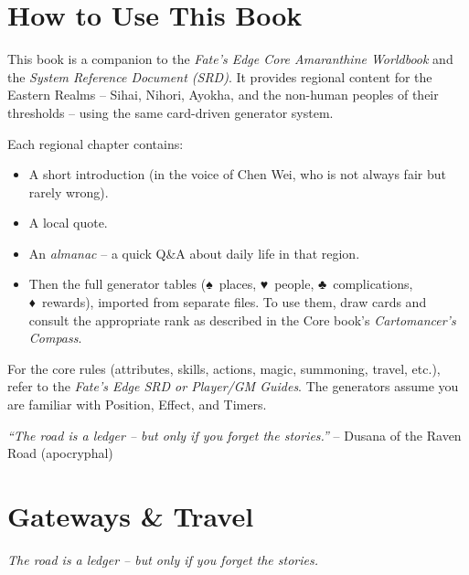 \documentclass[12pt,oneside]{book}
\newcommand{\spadesuit}{♠}
\newcommand{\heartsuit}{♥}
\newcommand{\clubsuit}{♣}
\newcommand{\diamondsuit}{♦}
\begin{document}
\chapter*{How to Use This Book}

This book is a companion to the \textit{Fate's Edge Core Amaranthine Worldbook} and the \textit{System Reference Document (SRD)}. It provides regional content for the Eastern Realms -- Sihai, Nihori, Ayokha, and the non-human peoples of their thresholds -- using the same card-driven generator system.

Each regional chapter contains:
\begin{itemize}
  \item A short introduction (in the voice of Chen Wei, who is not always fair but rarely wrong).
  \item A local quote.
  \item An \emph{almanac} -- a quick Q\&A about daily life in that region.
  \item Then the full generator tables (\spadesuit\ places, \heartsuit\ people, \clubsuit\ complications, \diamondsuit\ rewards), imported from separate files. To use them, draw cards and consult the appropriate rank as described in the Core book's \textit{Cartomancer's Compass}.
\end{itemize}

For the core rules (attributes, skills, actions, magic, summoning, travel, etc.), refer to the \textit{Fate's Edge SRD or Player/GM Guides}. The generators assume you are familiar with Position, Effect, and Timers.

\vspace{1em}
\noindent\textit{``The road is a ledger -- but only if you forget the stories.''} -- Dusana of the Raven Road (apocryphal)

\mainmatter


\chapter{Gateways \& Travel}
\emph{The road is a ledger -- but only if you forget the stories.}
\end{document}
